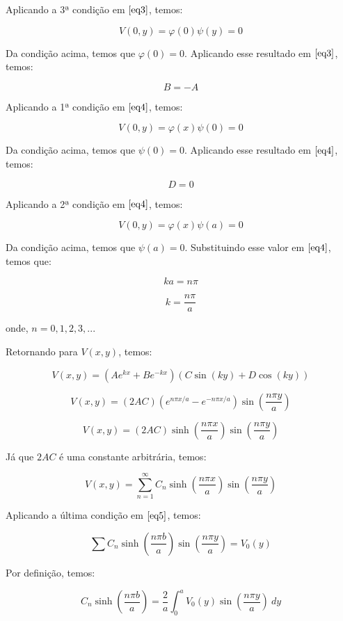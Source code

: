 \documentclass[11pt,a4paper]{article}
\begin{document}
\begin{enumerate}
\begin{enumerate}
Aplicando a 3ª condição em $\ref{eq3}$, temos:

$$V(0,y) = \varphi (0) \psi (y) = 0$$

Da condição acima, temos que $\varphi (0) = 0$. Aplicando esse resultado em $\ref{eq3}$, temos:

$$B = -A$$

Aplicando a 1ª condição em $\ref{eq4}$, temos:

$$V(0,y) = \varphi (x) \psi (0) = 0$$ 

Da condição acima, temos que $\psi (0) = 0$. Aplicando esse resultado em $\ref{eq4}$, temos:

$$D = 0$$

Aplicando a 2ª condição em $\ref{eq4}$, temos:

$$V(0,y) = \varphi (x) \psi (a) = 0$$ 

Da condição acima, temos que $\psi (a) = 0$. Substituindo esse valor em $\ref{eq4}$, temos que:

$$ka = n\pi$$ 

$$k = \displaystyle\dfrac{n\pi}{a}$$ 

onde, $n = 0, 1, 2, 3, ...$

Retornando para $V(x,y)$, temos:

$$V(x,y) = (A e^{kx} + B e^{-kx}) (C \sin(ky) + D \cos(ky))$$

$$V(x,y) = (2AC)(e^{n\pi x/a} - e^{-n\pi x/a}) \sin\left(\displaystyle\dfrac{n\pi y}{a}\right)$$

$$V(x,y) = (2AC)\sinh\left(\displaystyle\dfrac{n\pi x}{a}\right) \sin\left(\displaystyle\dfrac{n\pi y}{a}\right)$$

Já que $2AC$ é uma constante arbitrária, temos:

\begin{equation}
V(x,y) = \displaystyle\sum_{n=1}^\infty C_n \sinh\left(\displaystyle\dfrac{n\pi x}{a}\right) \sin\left(\displaystyle\dfrac{n\pi y}{a}\right) 
\label{eq5}
\end{equation}

Aplicando a última condição em $\ref{eq5}$, temos:

$$\displaystyle\sum C_n \sinh\left(\displaystyle\dfrac{n\pi b}{a}\right) \sin\left(\displaystyle\dfrac{n\pi y}{a}\right) = V_0(y)$$

Por definição, temos:

$$C_n \sinh\left(\displaystyle\dfrac{n\pi b}{a}\right) = \displaystyle\dfrac{2}{a}\displaystyle\int_0^{a} V_0(y) \sin\left(\displaystyle\dfrac{n\pi y}{a}\right) \ dy$$


\end{enumerate}
\end{enumerate}
\end{document}

